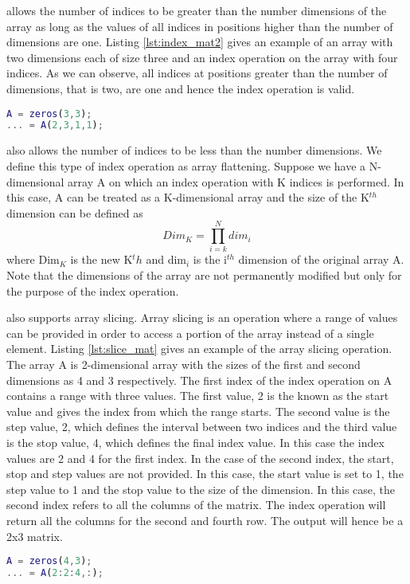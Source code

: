  \matlab allows the number of indices to be greater than the number dimensions of the array as long as the values of all indices in positions higher than the number of dimensions are one. Listing \ref{lst:index_mat2} gives an example of an array with two dimensions each of size three and an index operation on the array with four indices. As we can observe, all indices at positions greater than the number of dimensions, that is two, are one and hence the index operation is valid.
\begin{lstlisting}[language=matlab, label={lst:index_mat2}, caption={An example of an array index operation where the number of indices are greater than the number of dimensions of the array}]
A = zeros(3,3);
... = A(2,3,1,1);
\end{lstlisting}
\matlab also allows  the number of indices to be less than the number dimensions. We define this type of index operation as array flattening. Suppose we have a N-dimensional array A on which an index operation with K indices is performed. In this case, A can be treated as a K-dimensional array and the size of the K$^{th}$ dimension can be defined as 
\begin{equation}
Dim_K  = \prod_{i=k}^{N}{dim_i}
\end{equation}
where Dim$_K$ is the new K$^th$ and dim$_i$ is the i$^{th}$ dimension of the original array A. \\
Note that the dimensions of the array are not permanently modified but only for the purpose of the index operation.

\matlab also supports array slicing. Array slicing is an operation where a range of values can be provided in order to access a portion of the array instead of a single element. Listing \ref{lst:slice_mat} gives an example of the array slicing operation. The array A is 2-dimensional array with the sizes of the first and second dimensions as 4 and 3 respectively. The first index of the index operation on A contains a range with three values. The first value, 2 is the known as the start value and gives the index from which the range starts. The second value is the step value, 2, which defines the interval between two indices and the third value is the stop value, 4, which defines the final index value. In this case the index values are 2 and 4 for the first index. In the case of the second index, the start, stop and step values are not provided. In this case, the start value is set to 1, the step value to 1 and the stop value to the size of the dimension. In this case, the second index refers to all the columns of the matrix. The index operation will return all the columns for the second and fourth row. The output will hence be a 2x3  matrix.
\begin{lstlisting}[language=matlab, label={lst:slice_mat}, caption={An example of an array slicing operation in \matlab}]
A = zeros(4,3);
... = A(2:2:4,:);
\end{lstlisting}


